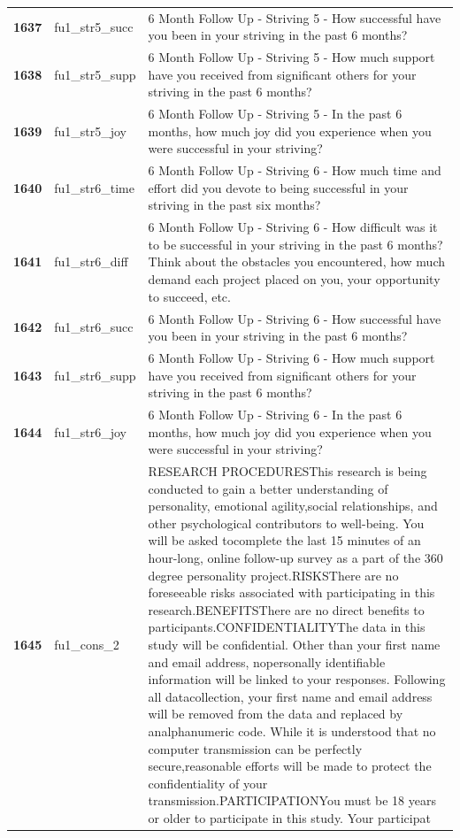 \documentclass[
  letterpaper,
  DIV=11,
  numbers=noendperiod]{scrartcl}
\begin{document}
\begin{longtable}[t]{>{}cll}
\textbf{1637} & fu1\_str5\_succ & 6 Month Follow Up - Striving 5 - How successful have you been in your striving in the past 6 months?\\
\textbf{1638} & fu1\_str5\_supp & 6 Month Follow Up - Striving 5 - How much support have you received from significant others for your striving in the past 6 months?\\
\textbf{1639} & fu1\_str5\_joy & 6 Month Follow Up - Striving 5 - In the past 6 months, how much joy did you experience when you were successful in your striving?\\
\textbf{1640} & fu1\_str6\_time & 6 Month Follow Up - Striving 6 - How much time and effort did you devote to being successful in your striving in the past six months?\\
\addlinespace
\textbf{1641} & fu1\_str6\_diff & 6 Month Follow Up - Striving 6 - How difficult was it to be successful in your striving in the past 6 months? Think about the obstacles you encountered, how much demand each project placed on you, your opportunity to succeed, etc.\\
\textbf{1642} & fu1\_str6\_succ & 6 Month Follow Up - Striving 6 - How successful have you been in your striving in the past 6 months?\\
\textbf{1643} & fu1\_str6\_supp & 6 Month Follow Up - Striving 6 - How much support have you received from significant others for your striving in the past 6 months?\\
\textbf{1644} & fu1\_str6\_joy & 6 Month Follow Up - Striving 6 - In the past 6 months, how much joy did you experience when you were successful in your striving?\\
\textbf{1645} & fu1\_cons\_2 & RESEARCH PROCEDURESThis research is being conducted to gain a better understanding of personality, emotional agility,social relationships, and other psychological contributors to well-being. You will be asked tocomplete the last 15 minutes of an hour-long, online follow-up survey as a part of the 360 degree personality project.RISKSThere are no foreseeable risks associated with participating in this research.BENEFITSThere are no direct benefits to participants.CONFIDENTIALITYThe data in this study will be confidential. Other than your first name and email address, nopersonally identifiable information will be linked to your responses. Following all datacollection, your first name and email address will be removed from the data and replaced by analphanumeric code. While it is understood that no computer transmission can be perfectly secure,reasonable efforts will be made to protect the confidentiality of your transmission.PARTICIPATIONYou must be 18 years or older to participate in this study. Your participat\\

\end{longtable}
\end{document}
